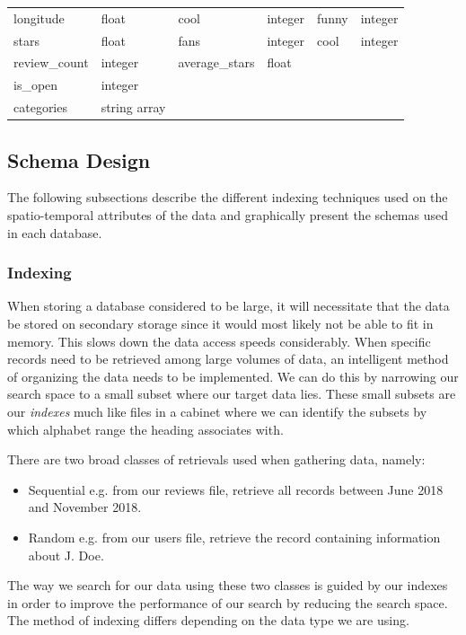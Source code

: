 \begin{table}[h]
\begin{tabular}{ |p{2cm}|p{2cm}||p{2cm}|p{2cm}||p{2cm}|p{2cm}|}
        longitude                       & float                       & cool                         & integer      & funny        & integer   \\
        stars                           & float                       & fans                         & integer      & cool         & integer   \\
        review\_count                   & integer                     & average\_stars               & float        &              &           \\
        is\_open                        & integer                     &                              &              &              &           \\
        categories                      & string array                &                              &              &              &           \\
        \hline
    \end{tabular}
    \label{tab:yelp-data}
\end{table}

\subsection{Schema Design}

The following subsections describe the different indexing techniques used on the spatio-temporal attributes of the data and graphically present the schemas used in each database.

\subsubsection{Indexing}
When storing a database considered to be large, it will necessitate that the data be stored on secondary storage since it would most likely not be able to fit in memory. This slows down the data access speeds considerably. When specific records need to be retrieved among large volumes of data, an intelligent method of organizing the data needs to be implemented. We can do this by narrowing our search space to a small subset where our target data lies. These small subsets are our \emph{indexes} much like files in a cabinet where we can identify the subsets by which alphabet range the heading associates with.

There are two broad classes \cite{btree} of retrievals used when gathering data, namely:
\begin{itemize}
    \item Sequential e.g. from our reviews file, retrieve all records between June 2018 and November 2018.
    \item Random e.g. from our users file, retrieve the record containing information about J. Doe.
\end{itemize}
The way we search for our data using these two classes is guided by our indexes in order to improve the performance of our search by reducing the search space. The method of indexing differs depending on the data type we are using.

